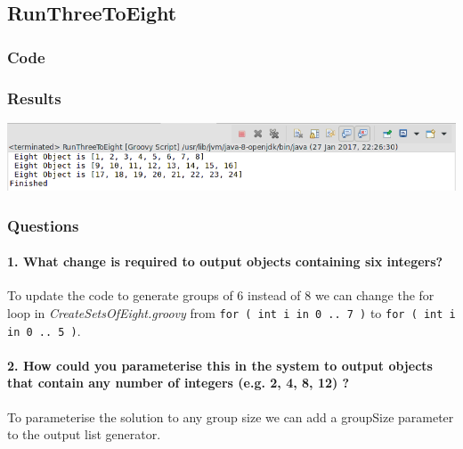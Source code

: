 \subsection{RunThreeToEight}

\subsubsection*{Code}


\subsubsection*{Results}

\includegraphics[width=\textwidth]{img/screenshots/2-2.png}


\subsubsection*{Questions}

\paragraph{1. What change is required to output objects containing six integers?}

To update the code to generate groups of 6 instead of 8 we can change the for loop in {\em CreateSetsOfEight.groovy} from \texttt{for ( int i in 0 .. 7 )} to \texttt{for ( int i in 0 .. 5 )}.

\paragraph{2. How could you parameterise this in the system to output objects that contain any number of integers (e.g. 2, 4, 8, 12) ?}

To parameterise the solution to any group size we can add a groupSize parameter to the output list generator.


